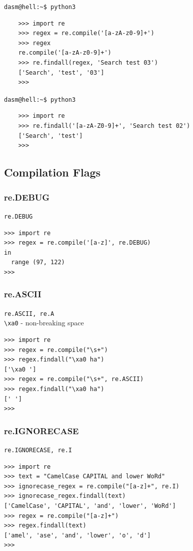 \documentclass{beamer}
\begin{document}
\begin{frame}[fragile]
    \verb|dasm@hell:~$ python3|
    \begin{lstlisting}
    >>> import re
    >>> regex = re.compile('[a-zA-z0-9]+')
    >>> regex
    re.compile('[a-zA-z0-9]+')
    >>> re.findall(regex, 'Search test 03')
    ['Search', 'test', '03']
    >>>
    \end{lstlisting}
\end{frame}

\begin{frame}[fragile]
    \verb|dasm@hell:~$ python3|
    \begin{lstlisting}
    >>> import re
    >>> re.findall('[a-zA-Z0-9]+', 'Search test 02')
    ['Search', 'test']
    >>>
    \end{lstlisting}
\end{frame}

\subsection{Compilation Flags}
\subsubsection{re.DEBUG}
\begin{frame}[fragile]
\verb/re.DEBUG/
\begin{lstlisting}
>>> import re
>>> regex = re.compile('[a-z]', re.DEBUG)
in
  range (97, 122)
>>>
\end{lstlisting}
\end{frame}

\subsubsection{re.ASCII}
\begin{frame}[fragile]
\verb/re.ASCII, re.A/ \\
\verb/\xa0/ - non-breaking space
\begin{lstlisting}
>>> import re
>>> regex = re.compile("\s+")
>>> regex.findall("\xa0 ha")
['\xa0 ']
>>> regex = re.compile("\s+", re.ASCII)
>>> regex.findall("\xa0 ha")
[' ']
>>>
\end{lstlisting}
\end{frame}

\subsubsection{re.IGNORECASE}
\begin{frame}[fragile]
\verb/re.IGNORECASE, re.I/ \\
\begin{lstlisting}
>>> import re
>>> text = "CamelCase CAPITAL and lower WoRd"
>>> ignorecase_regex = re.compile("[a-z]+", re.I)
>>> ignorecase_regex.findall(text)
['CamelCase', 'CAPITAL', 'and', 'lower', 'WoRd']
>>> regex = re.compile("[a-z]+")
>>> regex.findall(text)
['amel', 'ase', 'and', 'lower', 'o', 'd']
>>>
\end{lstlisting}
\end{frame}
\end{document}
